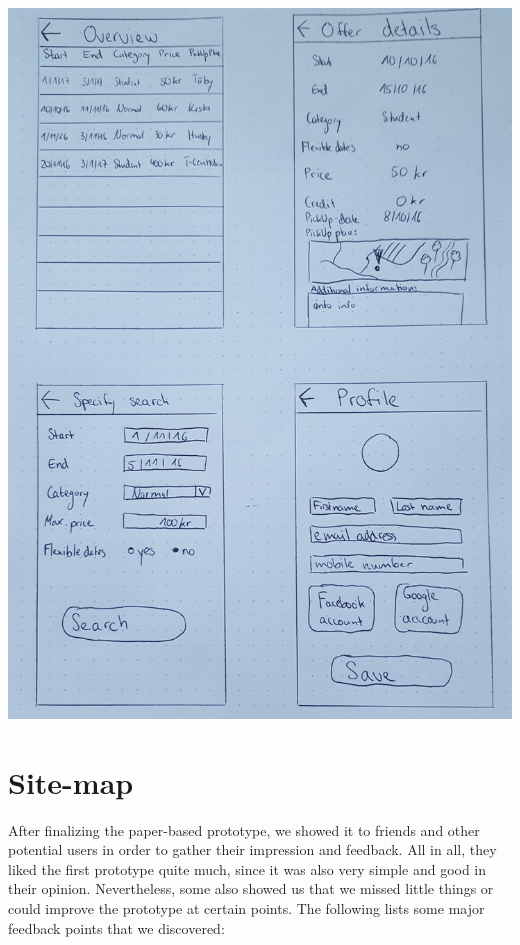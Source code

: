 \documentclass[11pt,twoside,a4paper]{report}
\begin{document}
\includegraphics[scale=0.06]{Paper_prototype2.jpg}


\newpage
\section{Site-map}

After finalizing the paper-based prototype, we showed it to friends and other potential users in order to gather their impression and feedback. All in all, they liked the first prototype quite much, since it was also very simple and good in their opinion. Nevertheless, some also showed us that we missed little things or could improve the prototype at certain points. The following lists some major feedback points that we discovered:
\end{document}
